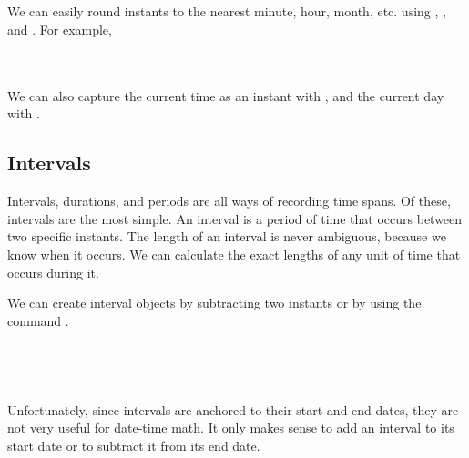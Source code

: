 \documentclass[article]{jss}
\begin{document}
\\
\\

\\
\\

We can easily round instants to the nearest minute, hour, month, etc. using , , and . For example,

\\
\\

We can also capture the current time as an instant with , and the current day with .



\subsection{Intervals}
\label{sec:intervals}

Intervals, durations, and periods are all ways of recording time spans. Of these, intervals are the most simple. An interval is a period of time that occurs between two specific instants. The length of an interval is never ambiguous, because we know when it occurs. We can calculate the exact lengths of any unit of time that occurs during it. 

We can create interval objects by subtracting two instants or by using the command .\\

\\
\\
\\
\\

Unfortunately, since intervals are anchored to their start and end dates, they are not very useful for date-time math. It only makes sense to add an interval to its start date or to subtract it from its end date.\\

\\
\\
\end{document}

